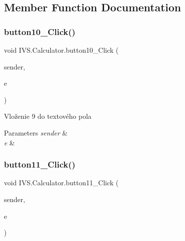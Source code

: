 

\subsection{Member Function Documentation}
\mbox{\label{class_i_v_s_1_1_calculator_aa06324ed88e9004bf9cd91dd9195e146}} 
\subsubsection{\texorpdfstring{button10\+\_\+\+Click()}{button10\_Click()}}
{\footnotesize\ttfamily void I\+V\+S.\+Calculator.\+button10\+\_\+\+Click (\begin{DoxyParamCaption}\item[{object}]{sender,  }\item[{Event\+Args}]{e }\end{DoxyParamCaption})\hspace{0.3cm}{\ttfamily [protected]}}



Vloženie \textquotesingle{}9\textquotesingle{} do textového pola 


\begin{DoxyParams}{Parameters}
{\em sender} & \\
\hline
{\em e} & \\
\hline
\end{DoxyParams}
\mbox{\label{class_i_v_s_1_1_calculator_af183a6b7dd102cfeceb0bff1495e9a0e}} 
\subsubsection{\texorpdfstring{button11\+\_\+\+Click()}{button11\_Click()}}
{\footnotesize\ttfamily void I\+V\+S.\+Calculator.\+button11\+\_\+\+Click (\begin{DoxyParamCaption}\item[{object}]{sender,  }\item[{Event\+Args}]{e }\end{DoxyParamCaption})\hspace{0.3cm}{\ttfamily [protected]}}




